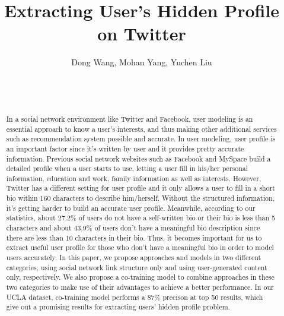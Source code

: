 \documentclass{sig-alternate}
\title{Extracting User's Hidden Profile on Twitter}
\author{
Dong Wang, Mohan Yang, Yuchen Liu
\and
\alignauthor
\affaddr{Department of Computer Science}\\
\affaddr{University of California, Los Angeles}\\
\email{\{dongw, yang, yliu\}@cs.ucla.edu}
}
\begin{document}
\maketitle

\begin{abstract}
In a social network environment like Twitter and Facebook, user modeling is an essential approach to know a user's interests, and thus making other additional services such as recommendation system possible and accurate. In user modeling, user profile is an important factor since it's written by user and it provides pretty accurate information. Previous social network websites such as Facebook and MySpace build a detailed profile when a user starts to use, letting a user fill in his/her personal information, education and work, family information as well as interests. However, Twitter has a different setting for user profile and it only allows a user to fill in a short bio within 160 characters to describe him/herself. Without the structured information, it's getting harder to build an accurate user profile. Meanwhile, according to our statistics, about 27.2\% of users do not have a self-written bio or their bio is less than 5 characters and about 43.9\% of users don't have a meaningful bio description since there are less than 10 characters in their bio. Thus, it becomes important for us to extract useful user profile for those who don't have a meaningful bio in order to model users accurately. In this paper, we propose approaches and models in two different categories, using social network link structure only and using user-generated content only, respectively. We also propose a co-training model to combine approaches in these two categories to make use of their advantages to achieve a better performance. In our UCLA dataset, co-training model performs a 87\% precison at top 50 results, which give out a promising results for extracting users' hidden profile problem.
\end{abstract}









{ }
\end{document}
